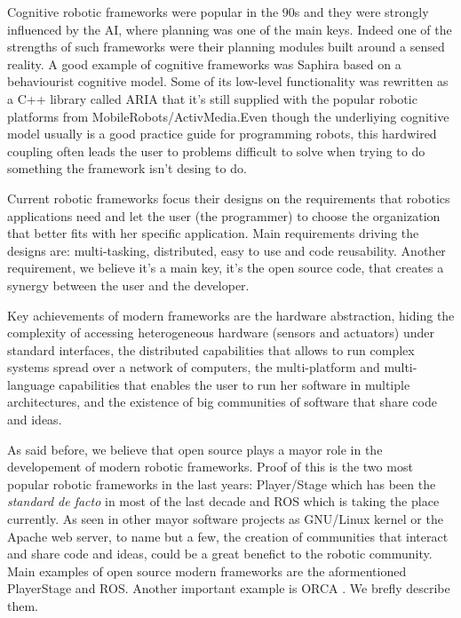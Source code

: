 \documentclass[twocolumn]{svjour3}          %
\begin{document}
Cognitive robotic frameworks were popular in the 90s and they were
strongly influenced by the AI, where planning was one of the main
keys. Indeed one of the strengths of such frameworks were their
planning modules built around a sensed reality. A good example of cognitive
frameworks was Saphira \cite{konolige98} based on a behaviourist
cognitive model. Some of its low-level functionality was rewritten as a
C++ library called ARIA \cite{aria} that it's still supplied with the
popular robotic platforms from MobileRobots/ActivMedia.Even though
the underliying cognitive model usually is a good practice guide for
programming robots, this hardwired coupling often leads the user to
problems difficult to solve when trying to do something the framework
isn't desing to do.

Current robotic frameworks focus their designs on the requirements
that robotics applications need and let the user (the programmer) to
choose the organization that better fits with her specific
application. Main requirements driving the designs are: multi-tasking, distributed, easy to
use and code reusability. Another requirement, we believe it's a main
key, it's the open source code, that creates a synergy between the user
and the developer. 

Key achievements of modern frameworks are the hardware abstraction, hiding the complexity of accessing heterogeneous hardware (sensors and
actuators) under standard interfaces, the distributed capabilities
that allows to run complex systems spread over a network of computers,
the multi-platform and multi-language capabilities that enables the
user to run her software in multiple architectures, and the existence
of big communities of software that share code and ideas.

As said before, we believe that open source plays a mayor role in the
developement of modern robotic frameworks. Proof of this is the two most popular robotic
frameworks in the last years: Player/Stage
\cite{Gerkey03,collet05,vaughan2007} which has been the \textit{standard de
facto} in most of the last decade and ROS \cite{quigley09} which is
taking the place currently. As seen in other mayor software projects
as GNU/Linux kernel or the Apache web server, to name but a few, the
creation of communities that interact and share code and ideas, could
be a great benefict to the robotic community. Main examples of open
source modern frameworks are the aformentioned PlayerStage and
ROS. Another important example is ORCA \cite{brooks05,brooks07}. We
brefly describe them.
\end{document}
